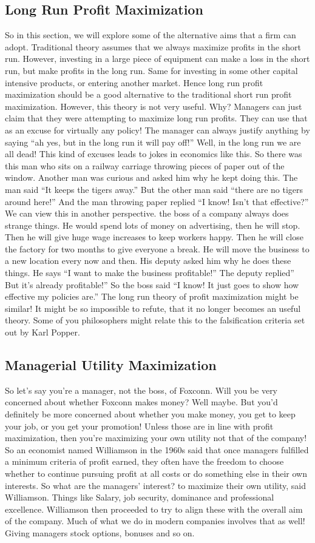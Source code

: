 \documentclass[DIV=calc,11pt,parskip,numbers=noenddot]{scrartcl} %
\begin{document}
\subsection{Long Run Profit Maximization}
 So in this section, we will explore some of the alternative aims that a firm can adopt. Traditional theory assumes that we always maximize profits in the short run. However, investing in a large piece of equipment can make a loss in the short run, but make profits in the long run. Same for investing in some other capital intensive products, or entering another market. Hence long run profit maximization should be a good alternative to the traditional short run profit maximization. However, this theory is not very useful. Why? Managers can just claim that they were attempting to maximize long run profits. They can use that as an excuse for virtually any policy! The manager can always justify anything by saying “ah yes, but in the long run it will pay off!” Well, in the long run we are all dead! This kind of excuses leads to jokes in economics like this. So there was this man who sits on a railway carriage throwing pieces of paper out of the window. Another man was curious and asked him why he kept doing this. The man said “It keeps the tigers away.” But the other man said “there are no tigers around here!” And the man throwing paper replied “I know! Isn’t that effective?” We can view this in another perspective. the boss of a company always does strange things. He would spend lots of money on advertising, then he will stop. Then he will give huge wage increases to keep workers happy. Then he will close the factory for two months to give everyone a break. He will move the business to a new location every now and then. His deputy asked him why he does these things. He says “I want to make the business profitable!” The deputy replied” But it’s already profitable!” So the boss said “I know! It just goes to show how effective my policies are.” The long run theory of profit maximization might be similar! It might be so impossible to refute, that it no longer becomes an useful theory. Some of you philosophers might relate this to the falsification criteria set out by Karl Popper. 
\subsection{Managerial Utility Maximization}
 So let’s say you’re a manager, not the boss, of Foxconn. Will you be very concerned about whether Foxconn makes money? Well maybe. But you’d definitely be more concerned about whether you make money, you get to keep your job, or you get your promotion! Unless those are in line with profit maximization, then you’re maximizing your own utility not that of the company! So an economist named Williamson in the 1960s said that once managers fulfilled a minimum criteria of profit earned, they often have the freedom to choose whether to continue pursuing profit at all costs or do something else in their own interests. So what are the managers’ interest? to maximize their own utility, said Williamson. Things like Salary, job security, dominance and professional excellence. Williamson then proceeded to try to align these with the overall aim of the company. Much of what we do in modern companies involves that as well! Giving managers stock options, bonuses and so on. 
\end{document}
